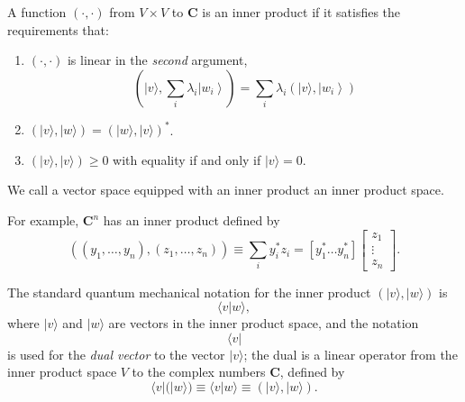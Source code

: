 


A function $(\cdot, \cdot)$ from $V \times V$ to $\mathbf{C}$ is an inner product if it satisfies the requirements that:
\begin{enumerate}
    \item $(\cdot, \cdot)$ is linear in the \textit{second} argument, 
\begin{equation}
    \left(|v\rangle, \sum_{i} \lambda_{i}\left|w_{i}\right\rangle\right)=\sum_{i} \lambda_{i}\left(|v\rangle,\left|w_{i}\right\rangle\right)
\end{equation}
    \item $(|v\rangle,|w\rangle)=(|w\rangle,|v\rangle)^{*}$.
    \item $(|v\rangle,|v\rangle) \geq 0$ with equality if and only if $|v\rangle=0$.
\end{enumerate}
We call a vector space equipped with an inner product an inner product space.

\begin{example}
    For example, $\mathbf{C}^{n}$ has an inner product defined by
\begin{equation}
    \left(\left(y_{1}, \ldots, y_{n}\right),\left(z_{1}, \ldots, z_{n}\right)\right) \equiv \sum_{i} y_{i}^{*} z_{i}=\left[y_{1}^{*} \ldots y_{n}^{*}\right]\left[\begin{array}{c}
z_{1} \\
\vdots \\
z_{n}
\end{array}\right].
\end{equation}
\end{example}

The standard quantum mechanical notation for the inner product $(|v\rangle,|w\rangle)$ is \begin{equation}
    \langle v | w\rangle,
\end{equation}where $|v\rangle$ and $|w\rangle$ are vectors in the inner product space, and the notation 
\begin{equation}
    \langle v|
\end{equation}
is used for the \textit{dual vector} to the vector $|v\rangle$; the dual is a linear operator from the inner product space $V$ to the complex numbers $\mathbf{C}$, defined by
\begin{equation}
    \langle v|(|w\rangle) \equiv\langle v | w\rangle \equiv(|v\rangle,|w\rangle).
\end{equation}

